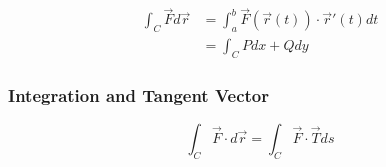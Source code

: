     \begin{align}
      \int_{C} \vec{F} d\vec{r}
        &= \int_{a}^{b} \vec{F}\left( \vec{r} \left( t \right) \right)
        \cdot \vec{r}'\left( t \right) dt \\
        &= \int_{C} P dx + Q dy
    \end{align}

    \subsubsection{Integration and Tangent Vector}

      \begin{equation}
        \int_{C} \vec{F} \cdot d \vec{r} = \int_{C} \vec{F} \cdot \vec{T} ds
      \end{equation}
